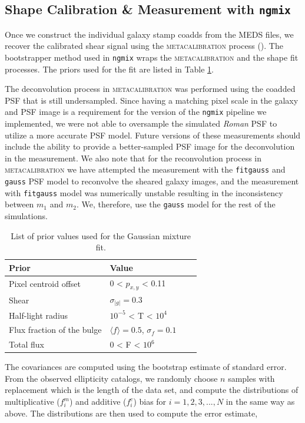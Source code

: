 \documentclass[fleqn,usenatbib]{mnras}
\begin{document}
\subsection{Shape Calibration \& Measurement with \texttt{ngmix}}
\label{subsec:mcal}
Once we construct the individual galaxy stamp coadds from the MEDS files, we recover the calibrated shear signal using the \textsc{metacalibration} process (\citealt{2017arXiv170202600H, 2017ApJ...841...24S}). The bootstrapper method used in \texttt{ngmix} wraps the \textsc{metacalibration} and the shape fit processes. The priors used for the fit are listed in Table \ref{tab:priors}.

The deconvolution process in  \textsc{metacalibration} was performed using the coadded PSF that is still undersampled. Since having a matching pixel scale in the galaxy and PSF image is a requirement for the version of the \texttt{ngmix} pipeline we implemented, we were not able to oversample the simulated \emph{Roman} PSF to utilize a more accurate PSF model. Future versions of these measurements should include the ability to provide a better-sampled PSF image for the deconvolution in the measurement. 
We also note that for the reconvolution process in \textsc{metacalibration} we have attempted the measurement with the \texttt{fitgauss} and \texttt{gauss} PSF model to reconvolve the sheared galaxy images, and the measurement with \texttt{fitgauss} model was numerically unstable resulting in the inconsistency between $m_{1}$ and $m_{2}$. We, therefore, use the \texttt{gauss} model for the rest of the simulations. 

\begin{table}
    \centering
    \begin{tabular}{|p{3cm}||p{3cm}|p{3cm}|p{3cm}|}
    \hline
    Prior & Value \\
    \hline
    Pixel centroid offset & 0 < $p_{x,y}$ < 0.11\\
    Shear & $\sigma_{|g|} = 0.3$\\
    Half-light radius & $10^{-5}$ < T < $10^{4}$\\
    Flux fraction of the bulge  & $\langle f\rangle = 0.5$, $\sigma_{f} = 0.1$\\
    Total flux & $0$ < F < $10^{6}$\\
    \hline
    \end{tabular}
    \caption{List of prior values used for the Gaussian mixture fit.}
    \label{tab:priors}
\end{table}

The covariances are computed using the bootstrap estimate of standard error. From the observed ellipticity catalogs, we randomly choose $n$ samples with replacement which is the length of the data set, and compute the distributions of multiplicative ($f^{m}_{i}$) and additive ($f^{c}_{i}$) bias for $i=1,2,3,...,N$ in the same way as above. The distributions are then used to compute the error estimate,  
\end{document}
